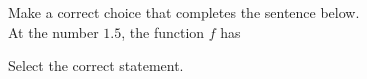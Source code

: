 \documentclass{ximera}
\begin{document}
\begin{question}
 Make a correct choice that completes the sentence below. \\
 
  At the number $1.5$, the function $f$ has 

  \begin{multipleChoice}
  \end{multipleChoice}
  \end{question}
  \begin{question}
Select the correct statement.
  \begin{multipleChoice}
  \end{multipleChoice}
\end{question}
\end{document}

